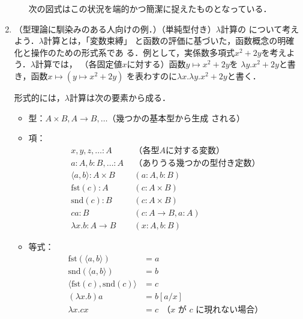\begin{enumerate}
\begin{itemize}
	      次の図式はこの状況を端的かつ簡潔に捉えたものとなっている．
	      \begin{center}
	      \end{center}
       \end{itemize}
 \item （型理論に馴染みのある人向けの例．）（単純型付き）$\lambda$計算の
      について考えよう．$\lambda$計算とは，「変数束縛」
       と函数の評価に基づいた，函数概念の明確化と操作のための形式系であ
       る．例として，実係数多項式$x^2 + 2y$を考えよう．$\lambda$計算では，
       （各固定値$x$に対する）函数$y \mapsto x^2 + 2y$を
       $\lambda y. x^2 + 2y$と書き，函数$x \mapsto (y \mapsto x^2 + 2y)$
       を表わすのに$\lambda x. \lambda y. x^2 + 2y$と書く．

       形式的には，$\lambda$計算は次の要素から成る．
       \label{型の圏}
       \begin{itemize}
	\item 型：$A \times B, A \to B, \ldots$（幾つかの基本型から生成
	      される）
	\item 項：
	      \begin{align*}
	       x, y, z,\ldots : A   \ &\ \text{（各型$A$に対する変数）}\\
	       a:A, b:B,\ldots : A  \ &\ \text{（ありうる幾つかの型付き定数）}\\
	       \langle a, b \rangle: A \times B \ &\ (a: A, b: B)\\
	       \mathrm{fst}(c): A   \ &\ (c: A \times B)\\
	       \mathrm{snd}(c): B   \ &\ (c: A \times B)\\
	       ca : B               \ &\ (c: A \to B, a : A)\\
	       \lambda x.b: A \to B \ &\ (x: A, b: B)
	      \end{align*}
	\item 等式：
	      \begin{align*}
	       \mathrm{fst}(\langle a, b \rangle) &= a\\
	       \mathrm{snd}(\langle a, b \rangle) &= b\\
	       \langle \mathrm{fst}(c), \mathrm{snd}(c) \rangle
	         &= c\\
	       (\lambda x. b)a &= b[a/x]\\
	       \lambda x. cx &= c\ \ \text{（$x$ が $c$ に現れない場合）}
	      \end{align*}
       \end{itemize}


\end{enumerate}
